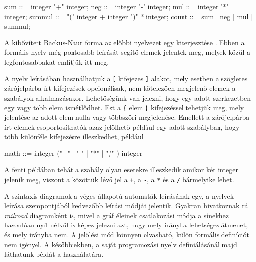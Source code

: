 \begin{cpp}
sum ::= integer "+" integer;
neg ::= integer "-" integer;
mul ::= integer "*" integer;
summul ::= "(" integer + integer ")" * integer;
count ::= sum | neg | mul | summul;
\end{cpp}

A kibővített Backus-Naur forma az előbbi nyelvezet egy kiterjesztése \cite{scowen1998extended}.
Ebben a formális nyelv még pontosabb leírását segítő elemek jelentek meg, melyek közül a legfontosabbakat említjük itt meg.

A nyelv leírásában használhatjuk a \texttt{[} kifejezes \texttt{]} alakot, mely esetben a szögletes zárójelpárba írt kifejezések opcionálisak, nem kötelezően megjelenő elemek a szabályok alkalmazásakor.
Lehetőségünk van jelezni, hogy egy adott szerkezetben egy vagy több elem ismétlődhet. Ezt a \texttt{\{} elem \texttt{\}} kifejezéssel tehetjük meg, mely jelentése az adott elem nulla vagy többszöri megjelenése.
Emellett a zárójelpárba írt elemek csoportosíthatók azaz jelölhető például egy adott szabályban, hogy több különféle kifejezésre illeszkedhet, például
\begin{cpp}
math ::= integer ("+" | "-" | "*" | "/" ) integer
\end{cpp}
A fenti példában tehát a szabály olyan esetekre illeszkedik amikor két integer jelenik meg, viszont a közöttük lévő jel a \texttt{+}, a \texttt{-}, a \texttt{*} és a \texttt{/} bármelyike lehet.


A szintaxis diagramok a véges állapotú automaták leírásának egy, a nyelvek leírása szempontjából kedvezőbb leírási módját jelentik. Gyakran hivatkoznak rá \textit{railroad} diagramként is, mivel a gráf éleinek csatlakozási módja a sínekhez hasonlóan nyíl nélkül is képes jelezni azt, hogy mely irányba lehetséges átmenet, és mely irányba nem. A jelölési mód könnyen olvasható, külön formális definíciót nem igényel. A későbbiekben, a saját programozási nyelv definiálásánál majd láthatunk példát a használatára.


